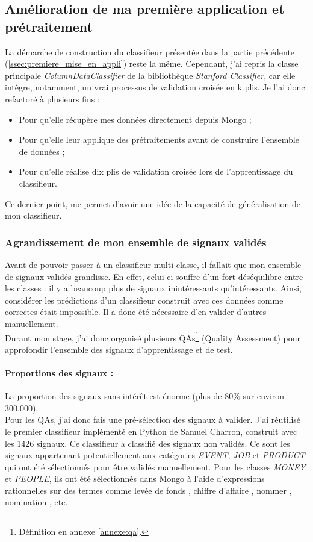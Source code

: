         \subsection{Amélioration de ma première application et prétraitement}
            La démarche de construction du classifieur présentée dans la partie précédente (\ref{ssec:premiere_mise_en_appli}) reste la même. Cependant, j'ai repris la classe principale \textit{ColumnDataClassifier} de la bibliothèque \textit{Stanford Classifier}, car elle intègre, notamment, un vrai processus de validation croisée en k plis. Je l'ai donc refactoré à plusieurs fins :
            \begin{itemize}
                \item Pour qu'elle récupère mes données directement depuis Mongo ;
                \item Pour qu'elle leur applique des prétraitements avant de construire l'ensemble de données ;
                \item Pour qu'elle réalise dix plis de validation croisée lors de l'apprentissage du classifieur.
            \end{itemize}
            Ce dernier point, me permet d'avoir une idée de la capacité de généralisation de mon classifieur.
            \subsubsection{Agrandissement de mon ensemble de signaux validés}
                Avant de pouvoir passer à un classifieur multi-classe, il fallait que mon ensemble de signaux validés grandisse. En effet, celui-ci souffre d'un fort déséquilibre entre les classes : il y a beaucoup plus de signaux inintéressants qu'intéressants. Ainsi, considérer les prédictions d'un classifieur construit avec ces données comme correctes était impossible. Il a donc été nécessaire d'en valider d'autres manuellement.\\

                Durant mon stage, j'ai donc organisé plusieurs QAs\footnote{Définition en annexe \ref{annexe:qa}.} (Quality Assessment) pour approfondir l'ensemble des signaux d’apprentissage et de test.

                \paragraph{Proportions des signaux :}
                La proportion des signaux sans intérêt est énorme (plus de 80\% sur environ 300.000).\\
                Pour les QAs, j'ai donc fais une pré-sélection des signaux à valider. J'ai réutilisé le premier classifieur implémenté en Python de Samuel Charron, construit avec les 1426 signaux. Ce classifieur a classifié des signaux non validés. Ce sont les signaux appartenant potentiellement aux catégories \textit{EVENT}, \textit{JOB} et \textit{PRODUCT} qui ont été sélectionnés pour être validés manuellement. Pour les classes \textit{MONEY} et \textit{PEOPLE}, ils ont été sélectionnés dans Mongo à l'aide d'expressions rationnelles sur des termes comme \og levée de fonds \fg, \og chiffre d'affaire \fg, \og nommer \fg, \og nomination \fg, etc.\\

